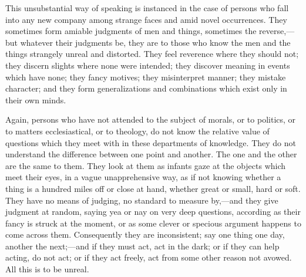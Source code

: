 This unsubstantial way of speaking is instanced in the case of
persons who fall into any new company among strange faces and amid
novel occurrences. They sometimes form amiable judgments of men and
things, sometimes the reverse,—but whatever their judgments be, they
are to those who know the men and the things strangely unreal and
distorted. They feel reverence where they should not; they discern
slights where none were intended; they discover meaning in events
which have none; they fancy motives; they misinterpret manner; they
mistake character; and they form generalizations and combinations
which exist only in their own minds.

Again, persons who have not attended to the subject of morals, or
to politics, or to matters ecclesiastical, or to theology, do not know
the relative value of questions which they meet with in these
departments of knowledge. They do not understand the difference
between one point and another. The one and the other are the same to
them. They look at them as infants gaze at the objects which meet
their eyes, in a vague unapprehensive way, as if not knowing whether a
thing is a hundred miles off or close at hand, whether great or small,
hard or soft. They have no means of judging, no standard to measure
by,—and they give judgment at random, saying yea or nay on very deep
questions, according as their fancy is struck at the moment, or as
some clever or specious argument happens to come across them.
Consequently they are inconsistent; say one thing one day, another the
next;—and if they must act, act in the dark; or if they can help
acting, do not act; or if they act freely, act from some other reason
not avowed. All this is to be unreal.

